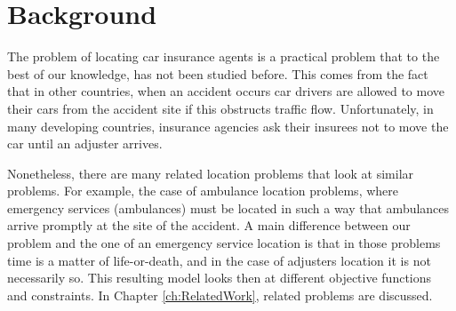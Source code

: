 \section{Background}
The problem of locating car insurance agents
is a practical problem
that to the best of our knowledge,
has not been studied before.
This comes
from the fact
that in other countries,
when an accident occurs
car drivers
are allowed to move their cars
from the accident site
if this obstructs traffic flow.
Unfortunately,
in many developing countries,
insurance agencies
ask their insurees
not to move the car
until an adjuster arrives.

Nonetheless,
there are many related location problems
that look at similar problems.
For example,
the case of
ambulance location problems,
where emergency services (ambulances)
must be located
in such a way that
ambulances arrive promptly
at the site of the accident.
A main difference
between our problem
and the one
of an emergency service location
is that in those problems
time is a matter of life-or-death,
and in the case of adjusters location
it is not necessarily so.
This resulting model
looks then at different objective functions
and constraints.
In Chapter \ref{ch:RelatedWork},
related problems are discussed.
